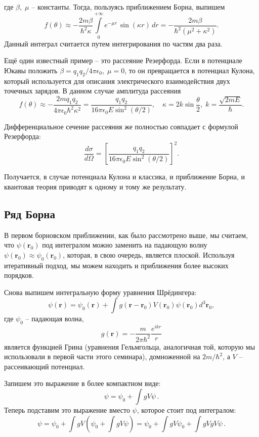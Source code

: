 где $\beta, \; \mu$ -- константы. Тогда, пользуясь приближением Борна, выпишем
\[
  f(\theta)\approx-\frac{2m\beta}{\hbar^2\kappa}\int\limits_0^{+\infty}e^{-\mu r}\,\sin(\kappa r)\,dr=-\frac{2m\beta}{\hbar^2(\mu^2+\kappa^2)}.
\]
Данный интеграл считается путем интегрирования по частям два раза.

Ещё один известный пример -- это рассеяние Резерфорда. Если в потенциале Юкавы
положить $\beta=q_1 q_2/4\pi\epsilon_0, \; \mu=0$, то он превращается в
потенциал Кулона, который используется для описания электрического
взаимодействия двух точечных зарядов. В данном случае амплитуда рассеяния
\[
  f(\theta)\approx-\frac{2mq_1 q_2}{4\pi\epsilon_0\hbar^2\kappa^2}= \frac{q_1 q_2}{16\pi\epsilon_0 E\sin^2(\theta/2)},\quad \kappa=2k\sin\frac{\theta}{2}, \; k=\frac{\sqrt{2mE}}{\hbar}.
\]

Дифференциальное сечение рассеяния же полностью совпадает с формулой
Резерфорда:
\[
  \frac{d\sigma}{d\Omega}=\left[\frac{q_1 q_2}{16\pi\epsilon_0 E\sin^2(\theta/2)}\right]^2.
\]

Получается, в случае потенциала Кулона и классика, и приближение Борна, и
квантовая теория приводят к одному и тому же результату.

\subsection{Ряд Борна}

В первом борновском приближении, как было рассмотрено выше, мы считаем, что
$\psi(\textbf{r}_0)$ под интегралом можно заменить на падающую волну
$\psi(\textbf{r}_0)\approx\psi_0(\textbf{r}_0)$, которая, в свою очередь,
является плоской. Используя итеративный подход, мы можем находить и приближения
более высоких порядков.

Снова выпишем интегральную форму уравнения Шрёдингера:
\[
  \psi(\textbf{r})=\psi_0(\textbf{r})+\int g(\textbf{r}-\textbf{r}_0)V(\textbf{r}_0)\psi(\textbf{r}_0)d^3\textbf{r}_0,
\]
где $\psi_0$ -- падающая волна,
\[
  g(\textbf{r}) = -\frac{m}{2\pi\hbar^2}\frac{e^{ikr}}{r}
\]
является функцией Грина (уравнения Гельмгольца, аналогичная той, которую мы
использовали в первой части этого семинара), домноженной на $2m/\hbar^2$, а $V$
-- рассеивающий потенциал.

Запишем это выражение в более компактном виде:
\[
  \psi = \psi_0 +\int gV\psi\,.
\]
Теперь подставим это выражение вместо $\psi$, которое стоит под интегралом:
\[
  \psi = \psi_0 + \int gV\left(\psi_0+\int gV\psi\right) = \psi_0 + \int gV\psi_0 + \int gVgV\psi\,.
\]

